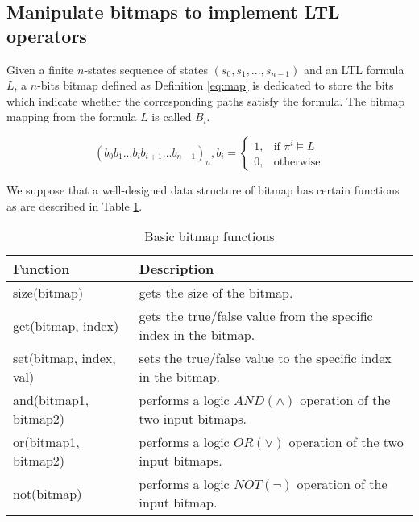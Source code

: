 \subsection{Manipulate bitmaps to implement LTL operators} %

Given a finite $n$-states sequence of states $(s_0, s_1, ..., s_{n - 1})$ and an LTL formula $L$, a $n$-bits bitmap defined as Definition \eqref{eq:map} is dedicated to store the bits which indicate whether the corresponding paths satisfy the formula. The bitmap mapping from the formula $L$ is called $B_l$.

\begin{equation}\label{eq:map}
(b_0b_1...b_ib_{i + 1}...b_{n - 1})_n, b_i = \begin{cases}
1, & \text{if $\pi^i \vDash L$} \\
0, & \text{otherwise}
\end{cases}
\end{equation}

We suppose that a well-designed data structure of bitmap has certain functions as are described in Table \ref{tbl:bmfuncs}.
\begin{table}[h]
\centering
\begin{tabular}{|l|l|}
\hline
Function & Description \\
\hline
size(bitmap) & gets the size of the bitmap. \\
\hline
get(bitmap, index) & gets the true/false value from the specific index in the bitmap. \\
\hline
set(bitmap, index, val) & sets the true/false value to the specific index in the bitmap. \\
\hline
and(bitmap1, bitmap2) & performs a logic $\mathit{AND}(\wedge)$ operation of the two input bitmaps. \\
\hline
or(bitmap1, bitmap2) & performs a logic $\mathit{OR}(\vee)$ operation of the two input bitmaps. \\
\hline
not(bitmap) & performs a logic $\mathit{NOT}(\neg)$ operation of the input bitmap. \\
\hline
\end{tabular}
\caption{Basic bitmap functions}
\label{tbl:bmfuncs}
\end{table}

